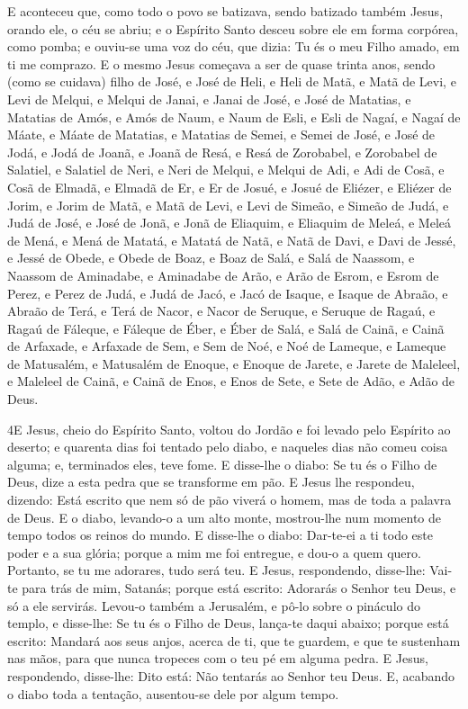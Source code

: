 E aconteceu que, como todo o povo se batizava, sendo batizado
também Jesus, orando ele, o céu se abriu; e o Espírito Santo
desceu sobre ele em forma corpórea, como pomba; e ouviu-se uma voz
do céu, que dizia: Tu és o meu Filho amado, em ti me comprazo.
E o mesmo Jesus começava a ser de quase trinta anos, sendo
(como se cuidava) filho de José, e José de Heli, e Heli de
Matã, e Matã de Levi, e Levi de Melqui, e Melqui de Janai, e Janai
de José, e José de Matatias, e Matatias de Amós, e Amós de
Naum, e Naum de Esli, e Esli de Nagaí, e Nagaí de Máate, e
Máate de Matatias, e Matatias de Semei, e Semei de José, e José de
Jodá, e Jodá de Joanã, e Joanã de Resá, e Resá de Zorobabel,
e Zorobabel de Salatiel, e Salatiel de Neri, e Neri de
Melqui, e Melqui de Adi, e Adi de Cosã, e Cosã de Elmadã, e Elmadã
de Er, e Er de Josué, e Josué de Eliézer, e Eliézer de Jorim,
e Jorim de Matã, e Matã de Levi, e Levi de Simeão, e Simeão
de Judá, e Judá de José, e José de Jonã, e Jonã de Eliaquim,
e Eliaquim de Meleá, e Meleá de Mená, e Mená de Matatá, e
Matatá de Natã, e Natã de Davi, e Davi de Jessé, e Jessé de
Obede, e Obede de Boaz, e Boaz de Salá, e Salá de Naassom, e
Naassom de Aminadabe, e Aminadabe de Arão, e Arão de Esrom, e Esrom
de Perez, e Perez de Judá, e Judá de Jacó, e Jacó de Isaque,
e Isaque de Abraão, e Abraão de Terá, e Terá de Nacor, e
Nacor de Seruque, e Seruque de Ragaú, e Ragaú de Fáleque, e Fáleque
de Éber, e Éber de Salá, e Salá de Cainã, e Cainã de
Arfaxade, e Arfaxade de Sem, e Sem de Noé, e Noé de Lameque,
e Lameque de Matusalém, e Matusalém de Enoque, e Enoque de
Jarete, e Jarete de Maleleel, e Maleleel de Cainã, e Cainã de
Enos, e Enos de Sete, e Sete de Adão, e Adão de Deus.

\medskip

\lettrine{4} E Jesus, cheio do Espírito Santo, voltou do
Jordão e foi levado pelo Espírito ao deserto; e quarenta dias
foi tentado pelo diabo, e naqueles dias não comeu coisa alguma; e,
terminados eles, teve fome. E disse-lhe o diabo: Se tu és o
Filho de Deus, dize a esta pedra que se transforme em pão. E
Jesus lhe respondeu, dizendo: Está escrito que nem só de pão viverá
o homem, mas de toda a palavra de Deus. E o diabo, levando-o a
um alto monte, mostrou-lhe num momento de tempo todos os reinos do
mundo. E disse-lhe o diabo: Dar-te-ei a ti todo este poder e a
sua glória; porque a mim me foi entregue, e dou-o a quem quero.
Portanto, se tu me adorares, tudo será teu. E Jesus,
respondendo, disse-lhe: Vai-te para trás de mim, Satanás; porque
está escrito: Adorarás o Senhor teu Deus, e só a ele servirás.
Levou-o também a Jerusalém, e pô-lo sobre o pináculo do templo,
e disse-lhe: Se tu és o Filho de Deus, lança-te daqui abaixo;
porque está escrito: Mandará aos seus anjos, acerca de ti,
que te guardem, e que te sustenham nas mãos, para que nunca
tropeces com o teu pé em alguma pedra. E Jesus, respondendo,
disse-lhe: Dito está: Não tentarás ao Senhor teu Deus. E,
acabando o diabo toda a tentação, ausentou-se dele por algum tempo.

